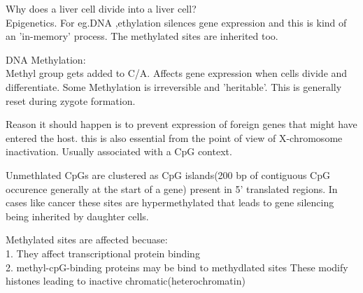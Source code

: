 \documentclass[a4paper]{article}
\begin{document}
Why does a liver cell divide into a liver cell? \\
Epigenetics. For eg.DNA ,ethylation silences gene expression and this is kind of an 'in-memory' process. The methylated sites are inherited too.

DNA Methylation: \\
Methyl group gets added to C/A. Affects gene expression when cells divide and differentiate.
Some Methylation is irreversible and 'heritable'. This is generally reset during zygote formation.

Reason it should happen is to prevent expression of foreign genes that might have entered the host.
this is also essential from the point of view of X-chromosome inactivation. Usually associated with a CpG 
context.

Unmethlated CpGs are clustered as CpG islands(200 bp of contiguous CpG occurence generally at the start of a gene) present in 5' 
translated regions. In cases like cancer these sites are hypermethylated that leads to gene silencing being inherited by daughter cells.

Methylated sites are affected becuase:\\
1. They  affect transcriptional protein binding \\
2. methyl-cpG-binding proteins may be bind to methydlated sites These modify histones leading to inactive chromatic(heterochromatin)
\end{document}
